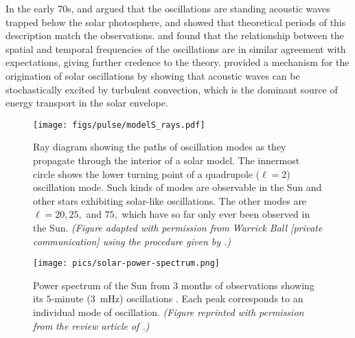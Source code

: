 In the early 70s, \citet{1970ApJ...162..993U} and \citet{1971ApL.....7..191L} argued that the oscillations are standing acoustic waves trapped below the solar photosphere, and showed that theoretical periods of this description match the observations. 
\citet{1975A&A....44..371D} and \citet{1977ApJ...218..901R} found that the relationship between the spatial and temporal frequencies of the oscillations are in similar agreement with expectations, giving further credence to the theory. 
\citet{1977ApJ...212..243G} provided a mechanism for the origination of solar oscillations by showing that acoustic waves can be stochastically excited by turbulent convection, which is the dominant source of energy transport in the solar envelope. 



\begin{figure}[t!]%
    \centering
    \vspace*{-0.35cm}
    \texttt{[image: figs/pulse/modelS\_rays.pdf]}
    \caption[Ray path diagram for solar oscillation modes]{Ray diagram showing the paths of oscillation modes as they propagate through the interior of a solar model. 
    The innermost circle shows the lower turning point of a quadrupole (${\ell=2}$) oscillation mode. 
    Such kinds of modes are observable in the Sun and other stars exhibiting solar-like oscillations. 
    The other modes are ${\ell=20}, 25,$ and $75,$ which have so far only ever been observed in the Sun. 
    \emph{(Figure adapted with permission from Warrick Ball [private communication] using the procedure given by \citealt{2000PhDT.........9G}.)}
    \label{fig:rays}}
\end{figure}


\begin{figure}
    \centering
    \texttt{[image: pics/solar-power-spectrum.png]}
    \caption[Historical solar power spectrum]{Power spectrum of the Sun from $3$ months of observations showing its $5$-minute ($3$~mHz) oscillations \citep{1981SoPh...74...51C}. 
    Each peak corresponds to an individual mode of oscillation. 
    \emph{(Figure reprinted with permission from the review article of \citealt{1984ARA&A..22..593D}.)}
    \label{fig:solar-power-spectrum}}
\end{figure}


